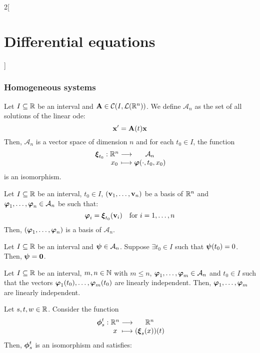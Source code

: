 \documentclass[../../../main.tex]{subfiles}
\begin{document}
\begin{multicols}{2}[\section{Differential equations}]
  \subsubsection{Homogeneous systems}
  \begin{theorem}
    Let $I\subseteq\mathbb{R}$ be an interval and $\boldsymbol{\mathrm{A}}\in\mathcal{C}(I,\mathcal{L}(\mathbb{R}^n))$. We define $\mathcal{A}_n$ as the set of all solutions of the linear ode:
    \begin{equation}\label{DE_homo}
      \boldsymbol{\mathrm{x}}'=\boldsymbol{\mathrm{A}}(t)\boldsymbol{\mathrm{x}}
    \end{equation} Then, $\mathcal{A}_n$ is a vector space of dimension $n$ and for each $t_0\in I$, the function
    $$
      \function{\vectorfunction{\xi}_{t_0}}{\RR^n}{\mathcal{A}_n}{x_0}{\vectorfunction{\varphi}(\cdot,t_0,x_0)}
    $$
    is an isomorphism.
  \end{theorem}
  \begin{corollary}
    Let $I\subseteq\mathbb{R}$ be an interval, $t_0\in I$, $(\boldsymbol{\mathrm{v}}_1,\ldots,\boldsymbol{\mathrm{v}}_n)$ be a basis of $\mathbb{R}^n$ and $\boldsymbol{\mathrm{\varphi}}_1,\ldots,\boldsymbol{\mathrm{\varphi}}_n\in\mathcal{A}_n$ be such that: $$\boldsymbol{\mathrm{\varphi}}_i=\boldsymbol{\mathrm{\xi}}_{t_0}(\boldsymbol{\mathrm{v}}_i)\quad\text{for } i=1,\ldots,n$$
    Then, $(\boldsymbol{\mathrm{\varphi}}_1,\ldots,\boldsymbol{\mathrm{\varphi}}_n)$ is a basis of $\mathcal{A}_n$.
  \end{corollary}
  \begin{corollary}
    Let $I\subseteq\mathbb{R}$ be an interval and $\boldsymbol{\mathrm{\psi}}\in\mathcal{A}_n$. Suppose $\exists t_0\in I$ such that $\boldsymbol{\mathrm{\psi}} (t_0)=0$. Then, $\boldsymbol{\mathrm{\psi}}=\boldsymbol{\mathrm{0}}$.
  \end{corollary}
  \begin{corollary}
    Let $I\subseteq\mathbb{R}$ be an interval, $m,n\in\mathbb{N}$ with $m\leq n$, $\boldsymbol{\mathrm{\varphi}}_1,\ldots,\boldsymbol{\mathrm{\varphi}}_m\in\mathcal{A}_n$ and $t_0\in I$ such that the vectors $\boldsymbol{\mathrm{\varphi}}_1(t_0),\ldots,\boldsymbol{\mathrm{\varphi}}_m(t_0)$ are linearly independent. Then, $\boldsymbol{\mathrm{\varphi}}_1,\ldots,\boldsymbol{\mathrm{\varphi}}_m$ are linearly independent.
  \end{corollary}
  \begin{corollary}
    Let $s,t,w\in\mathbb{R}$. Consider the function
    $$
      \function{\vectorfunction{\phi}_s^t}{\RR^n}{\RR^n}{x}{(\vectorfunction{\xi}_s(x))(t)}
    $$
    Then, $\boldsymbol{\mathrm{\phi}}_s^t$ is an isomorphism and satisfies:
    \begin{enumerate}

\end{enumerate}
\end{corollary}
\end{multicols}
\end{document}
